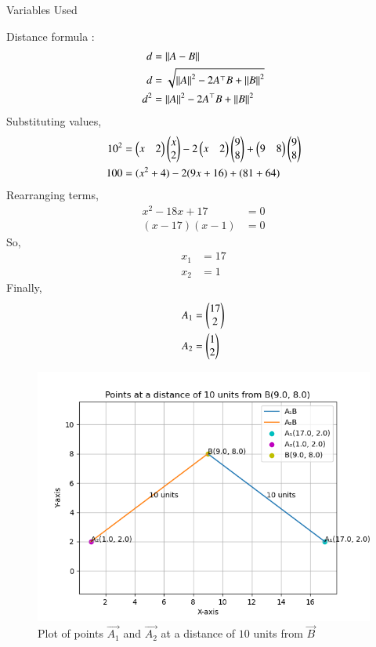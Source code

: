 \documentclass[journal]{IEEEtran}
\begin{document}
\solution
\begin{table}[h!]    
  \centering
  
  \caption{Variables Used}
  \label{tab1.9.19.1}
\end{table}
Distance formula :
\begin{align}
	d&=\left\lVert A-B\right\rVert \\
	d&=\sqrt{\left\lVert A\right\rVert^2-2A^\top B+\left\lVert B\right\rVert^2} \\
	d^2&=\left\lVert A\right\rVert^2-2A^\top B+\left\lVert B\right\rVert^2
\end{align}
Substituting values,
\begin{align}
	10^2&=\begin{pmatrix}x&2\end{pmatrix}\begin{pmatrix}x\\2\end{pmatrix}-2\begin{pmatrix}x&2\end{pmatrix}\begin{pmatrix}9\\8\end{pmatrix}+\begin{pmatrix}9&8\end{pmatrix}\begin{pmatrix}9\\8\end{pmatrix} \\
	100&=(x^2+4)-2(9x+16)+(81+64)
\end{align}
Rearranging terms,
\begin{align}
	x^2-18x+17&=0 \\
	(x-17)(x-1)&=0
\end{align}
So,
\begin{align}
	x_1&=17\\
	x_2&=1
\end{align}
Finally,
\begin{align}
	A_1&=\begin{pmatrix}17\\2\end{pmatrix}\\
	A_2&=\begin{pmatrix}1\\2\end{pmatrix}
\end{align}
\begin{figure}[ht!]
	\centering
   	\includegraphics[width=0.8\linewidth]{figs/plot.png}
   	\caption{Plot of points $\vec{A_1}$ and $\vec{A_2}$ at a distance of $10$ units from $\vec{B}$}
\label{Plot}
\end{figure}
\end{document}
